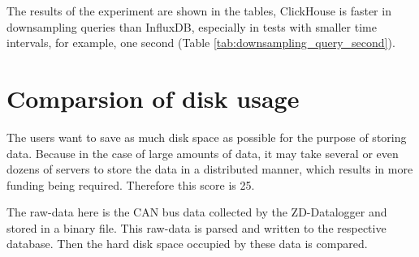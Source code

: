 The results of the experiment are shown in the tables, ClickHouse is faster in downsampling queries than InfluxDB, especially in tests with smaller time intervals, for example, one second (Table \ref{tab:downsampling_query_second}).


\section{Comparsion of disk usage}
The users want to save as much disk space as possible for the purpose of storing data. Because in the case of large amounts of data, it may take several or even dozens of servers to store the data in a distributed manner, which results in more funding being required. Therefore this score is 25.

The raw-data here is the CAN bus data collected by the ZD-Datalogger and stored in a binary file. This raw-data is parsed and written to the respective database. Then the hard disk space occupied by these data is compared.

